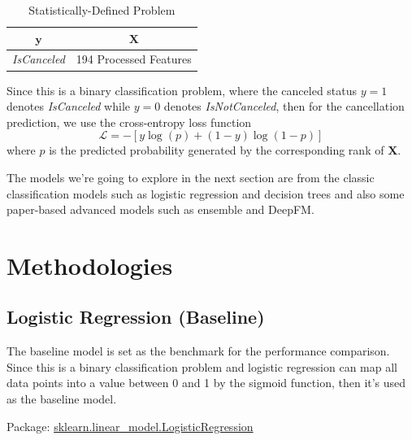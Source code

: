 \documentclass[10pt,twocolumn,letterpaper]{article}
\begin{document}
\begin{table}[ht]
\begin{center}
\begin{tabular}{|c|c|} \hline
    $\mathbf{y}$ & $\mathbf{X}$ \\ \hline
    \emph{IsCanceled} & 194 Processed Features \\
\hline
\end{tabular}
\end{center}
\caption{\label{tab:ProblemDef} Statistically-Defined Problem}
\end{table}

Since this is a binary classification problem, where the canceled status $y=1$ denotes \emph{IsCanceled} while $y=0$ denotes \emph{IsNotCanceled}, then for the cancellation prediction, we use the cross-entropy loss function 
$$ \mathcal{L} = - [ y \log (p)  + (1-y) \log (1-p) ] $$
where $p$ is the predicted probability generated by the corresponding rank of $\mathbf{X}$.

The models we're going to explore in the next section are from the classic classification models such as logistic regression and decision trees and also some paper-based advanced models such as ensemble and DeepFM.


\section{Methodologies}


\subsection{Logistic Regression (Baseline)}
The baseline model is set as the benchmark for the performance comparison. Since this is a binary classification problem and logistic regression can map all data points into a value between 0 and 1 by the sigmoid function, then it's used as the baseline model. 

Package: \href{https://scikit-learn.org/stable/modules/generated/sklearn.linear_model.LogisticRegression.html}{sklearn.linear\_model.LogisticRegression}


\end{document}
